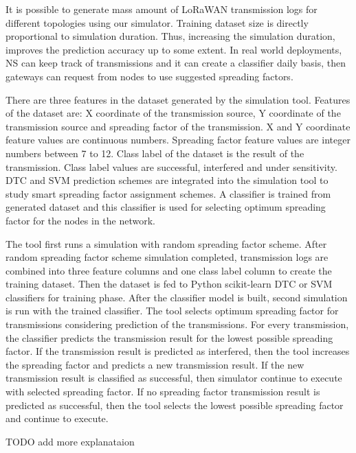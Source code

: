 It is possible to generate mass amount of LoRaWAN transmission logs for different topologies using our simulator. Training dataset size is directly proportional to simulation duration. Thus, increasing the simulation duration, improves the prediction accuracy up to some extent. In real world deployments, NS can keep track of transmissions and it can create a classifier daily basis, then gateways can request from nodes to use suggested spreading factors.

There are three features in the dataset generated by the simulation tool. Features of the dataset are: X coordinate of the transmission source, Y coordinate of the transmission source and spreading factor of the transmission. X and Y coordinate feature values are continuous numbers. Spreading factor feature values are integer numbers between 7 to 12. Class label of the dataset is the result of the transmission. Class label values are successful, interfered and under sensitivity. DTC and SVM prediction schemes are integrated into the simulation tool to study smart spreading factor assignment schemes. A classifier is trained from generated dataset and this classifier is used for selecting optimum spreading factor for the nodes in the network.

The tool first runs a simulation with random spreading factor scheme. After random spreading factor scheme simulation completed, transmission logs are combined into three feature columns and one class label column to create the training dataset. Then the dataset is fed to Python scikit-learn DTC or SVM classifiers for training phase. After the classifier model is built, second simulation is run with the trained classifier. The tool selects optimum spreading factor for transmissions considering prediction of the transmissions. For every transmission, the classifier predicts the transmission result for the lowest possible spreading factor. If the transmission result is predicted as interfered, then the tool increases the spreading factor and predicts a new transmission result. If the new transmission result is classified as successful, then simulator continue to execute with selected spreading factor. If no spreading factor transmission result is predicted as successful, then the tool selects the lowest possible spreading factor and continue to execute.

TODO add more explanataion